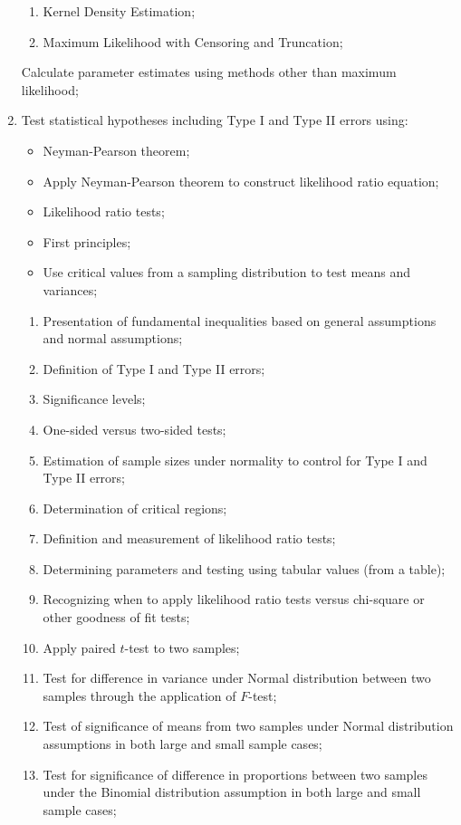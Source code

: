 \documentclass[12pt, titlepage, french]{report}
\begin{document}
\begin{outcomes}
\begin{enumerate}
\begin{knowledge}
\begin{enumerate}[label = \alph*.]
	\item	Kernel Density Estimation;
	\item	Maximum Likelihood with Censoring and Truncation;
	\end{enumerate}
	\end{knowledge}
\tcbline
	Calculate parameter estimates using methods other than maximum likelihood;
	\item	Test statistical hypotheses including Type I and Type II errors using:
		\begin{itemize}
		\item	Neyman-Pearson theorem;
		\item[]	Apply Neyman-Pearson theorem to construct likelihood ratio equation;
		\item	Likelihood ratio tests;
		\item	First principles;
		\item[]	Use critical values from a sampling distribution to test means and variances;
		\end{itemize}		
	\begin{knowledge}
	\begin{enumerate}[label = \alph*.]
	\item	Presentation of fundamental inequalities based on general assumptions and normal assumptions;
	\item	Definition of Type I and Type II errors;
	\item	Significance levels;
	\item	One-sided versus two-sided tests;
	\item	Estimation of sample sizes under normality to control for Type I and Type II errors;
	\item	Determination of critical regions;
	\item	Definition and measurement of likelihood ratio tests;
	\item	Determining parameters and testing using tabular values (from a table);
	\item	Recognizing when to apply likelihood ratio tests versus chi-square or other goodness of fit tests;
	\item	Apply paired $t$-test to two samples;
	\item	Test for difference in variance under Normal distribution between two samples through the application of $F$-test;
	\item	Test of significance of means from two samples under Normal distribution assumptions in both large and small sample cases;
	\item	Test for significance of difference in proportions between two samples under the Binomial distribution assumption in both large and small sample cases;

\end{enumerate}
\end{knowledge}
\end{enumerate}
\end{outcomes}
\end{document}
